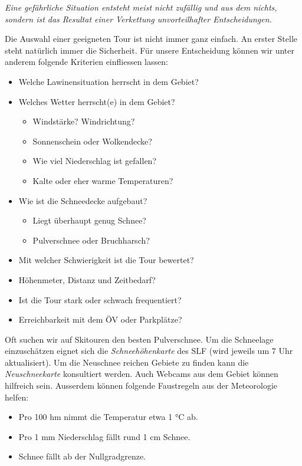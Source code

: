 \textit{Eine gefährliche Situation entsteht meist nicht zufällig und aus dem nichts, sondern ist das Resultat einer Verkettung unvorteilhafter Entscheidungen.}

\newcolumn

Die Auswahl einer geeigneten Tour ist nicht immer ganz einfach.
An erster Stelle steht natürlich immer die Sicherheit.
Für unsere Entscheidung können wir unter anderem folgende Kriterien einfliessen lassen:

\begin{itemize}
  \item{Welche Lawinensituation herrscht in dem Gebiet?}
  \item{
    Welches Wetter herrscht(e) in dem Gebiet?
    \begin{itemize}
      \item{Windstärke? Windrichtung?}
      \item{Sonnenschein oder Wolkendecke?}
      \item{Wie viel Niederschlag ist gefallen?}
      \item{Kalte oder eher warme Temperaturen?}
    \end{itemize}
  }
  \item{
    Wie ist die Schneedecke aufgebaut?
    \begin{itemize}
      \item{Liegt überhaupt genug Schnee?}
      \item{Pulverschnee oder Bruchharsch?}
    \end{itemize}
  }
  \item{Mit welcher Schwierigkeit ist die Tour bewertet?}
  \item{Höhenmeter, Distanz und Zeitbedarf?}
  \item{Ist die Tour stark oder schwach frequentiert?}
  \item{Erreichbarkeit mit dem ÖV oder Parkplätze?}
\end{itemize}

Oft suchen wir auf Skitouren den besten Pulverschnee.
Um die Schneelage einzuschätzen eignet sich die \textit{Schneehöhenkarte} des SLF (wird jeweils um 7 Uhr aktualisiert).
Um die Neuschnee reichen Gebiete zu finden kann die \textit{Neuschneekarte} konsultiert werden.
Auch Webcams aus dem Gebiet können hilfreich sein.
Ausserdem können folgende Faustregeln aus der Meteorologie helfen:

\begin{itemize}
  \item{Pro 100 hm nimmt die Temperatur etwa 1 °C ab.}
  \item{Pro 1 mm Niederschlag fällt rund 1 cm Schnee.}
  \item{Schnee fällt ab der Nullgradgrenze.}
\end{itemize}


